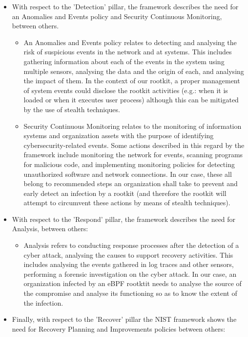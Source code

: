 \begin{itemize}
\begin{itemize}
	\end{itemize}
\item With respect to the 'Detection' pillar, the framework describes the need for an Anomalies and Events policy and Security Continuous Monitoring, between others.
	\begin{itemize}
	\item An Anomalies and Events policy relates to detecting and analysing the risk of suspicious events in the network and at systems. This includes gathering information about each of the events in the system using multiple sensors, analysing the data and the origin of each, and analysing the impact of them. In the context of our rootkit, a proper management of system events could disclose the rootkit activities (e.g.: when it is loaded or when it executes user process) although this can be mitigated by the use of stealth techniques.
	\item Security Continuous Monitoring relates to the monitoring of information systems and organization assets with the purpose of identifying cybersecurity-related events. Some actions described in this regard by the framework include monitoring the network for events, scanning programs for malicious code, and implementing monitoring policies for detecting unauthorized software and network connections. In our case, these all belong to recommended steps an organization shall take to prevent and early detect an infection by a rootkit (and therefore the rootkit will attempt to circumvent these actions by means of stealth techniques).
	\end{itemize}
\item With respect to the 'Respond' pillar, the framework describes the need for Analysis, between others:
	\begin{itemize}
	\item Analysis refers to conducting response processes after the detection of a cyber attack, analysing the causes to support recovery activities. This includes analysing the events gathered in log traces and other sensors, performing a forensic investigation on the cyber attack. In our case, an organization infected by an eBPF rootktit needs to analyse the source of the compromise and analyse its functioning so as to know the extent of the infection.
	\end{itemize}
\item Finally, with respect to the 'Recover' pillar the NIST framework shows the need for Recovery Planning and Improvements policies between others:
	\begin{itemize}

\end{itemize}
\end{itemize}
